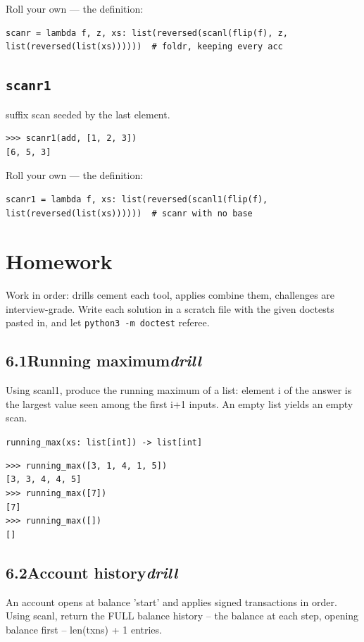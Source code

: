 \documentclass[10pt,letterpaper]{book}
\begin{document}
Roll your own --- the definition:

\begin{lstlisting}[style=ex]
scanr = lambda f, z, xs: list(reversed(scanl(flip(f), z, list(reversed(list(xs))))))  # foldr, keeping every acc
\end{lstlisting}

\subsection{\texttt{scanr1}}\label{def:scanr1}
suffix scan seeded by the last element.
\begin{lstlisting}[style=ex]
>>> scanr1(add, [1, 2, 3])
[6, 5, 3]
\end{lstlisting}

Roll your own --- the definition:

\begin{lstlisting}[style=ex]
scanr1 = lambda f, xs: list(reversed(scanl1(flip(f), list(reversed(list(xs))))))  # scanr with no base
\end{lstlisting}

\section{Homework}
Work in order: drills cement each tool, applies combine them,
challenges are interview-grade. Write each solution in a scratch file with
the given doctests pasted in, and let \texttt{python3 -m doctest} referee.
\subsection*{6.1\quad Running maximum\hfill\textnormal{\textit{drill}}}
Using scanl1, produce the running maximum of a list: element i of the answer is the largest value seen among the first i+1 inputs. An empty list yields an empty scan.

\noindent\texttt{running\_max(xs: list[int]) -> list[int]}
\begin{lstlisting}[style=ex]
>>> running_max([3, 1, 4, 1, 5])
[3, 3, 4, 4, 5]
>>> running_max([7])
[7]
>>> running_max([])
[]
\end{lstlisting}
\subsection*{6.2\quad Account history\hfill\textnormal{\textit{drill}}}
An account opens at balance 'start' and applies signed transactions in order. Using scanl, return the FULL balance history -- the balance at each step, opening balance first -- len(txns) + 1 entries.
\end{document}
